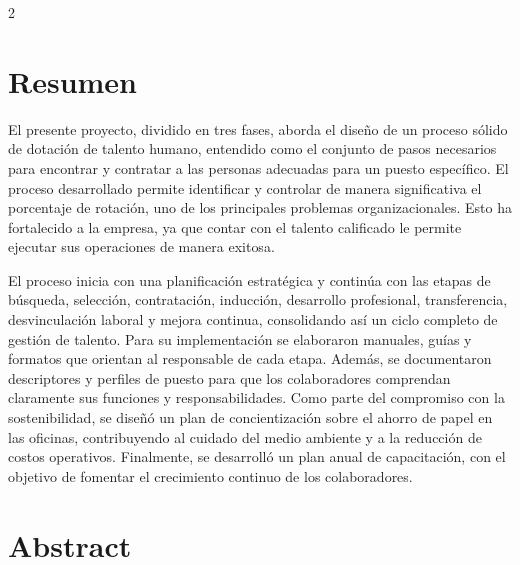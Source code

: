 \documentclass[12pt,spanish,Letterpaper,openany]{book}
\begin{document}
\begin {multicols}{2}

\hypertarget{resumen-4}{%
\section{Resumen}\label{resumen-4}}

El presente proyecto, dividido en tres fases, aborda el diseño de un proceso sólido de dotación de talento humano, entendido como el conjunto de pasos necesarios para encontrar y contratar a las personas adecuadas para un puesto específico. El proceso desarrollado permite identificar y controlar de manera significativa el porcentaje de rotación, uno de los principales problemas organizacionales. Esto ha fortalecido a la empresa, ya que contar con el talento calificado le permite ejecutar sus operaciones de manera exitosa.

El proceso inicia con una planificación estratégica y continúa con las etapas de búsqueda, selección, contratación, inducción, desarrollo profesional, transferencia, desvinculación laboral y mejora continua, consolidando así un ciclo completo de gestión de talento. Para su implementación se elaboraron manuales, guías y formatos que orientan al responsable de cada etapa. Además, se documentaron descriptores y perfiles de puesto para que los colaboradores comprendan claramente sus funciones y responsabilidades. Como parte del compromiso con la sostenibilidad, se diseñó un plan de concientización sobre el ahorro de papel en las oficinas, contribuyendo al cuidado del medio ambiente y a la reducción de costos operativos. Finalmente, se desarrolló un plan anual de capacitación, con el objetivo de fomentar el crecimiento continuo de los colaboradores.

\hypertarget{abstract-4}{%
\section{Abstract}\label{abstract-4}}


\end{multicols}
\end{document}
